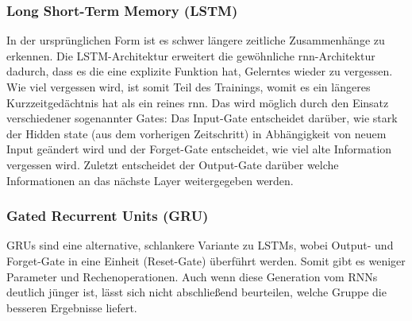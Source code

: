 \subsubsection*{Long Short-Term Memory (LSTM)}

In der ursprünglichen Form ist es schwer längere zeitliche Zusammenhänge zu erkennen.
Die LSTM-Architektur \cite{Hochreiter97} erweitert die gewöhnliche \gls{rnn}-Architektur dadurch, dass es die eine explizite Funktion hat, Gelerntes wieder zu vergessen.
Wie viel vergessen wird, ist somit Teil des Trainings, womit es ein längeres Kurzzeitgedächtnis hat als ein reines \gls{rnn}.
Das wird möglich durch den Einsatz verschiedener sogenannter Gates:
Das Input-Gate entscheidet darüber, wie stark der Hidden state (aus dem vorherigen Zeitschritt) in Abhängigkeit von neuem Input geändert wird und der Forget-Gate entscheidet, wie viel alte Information vergessen wird.
Zuletzt entscheidet der Output-Gate darüber welche Informationen an das nächste Layer weitergegeben werden.

\subsubsection*{Gated Recurrent Units (GRU)}

GRUs \cite{Cho14} sind eine alternative, schlankere Variante zu LSTMs, wobei Output- und Forget-Gate in eine Einheit (Reset-Gate) überführt werden.
Somit gibt es weniger Parameter und Rechenoperationen.
Auch wenn diese Generation vom RNNs deutlich jünger ist, lässt sich nicht abschließend beurteilen, welche Gruppe die besseren Ergebnisse liefert.

